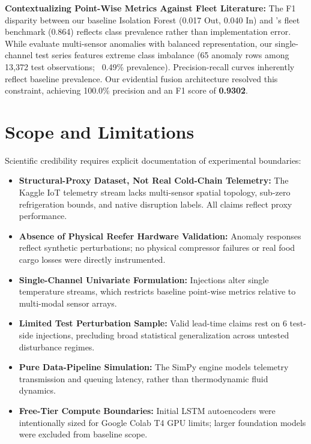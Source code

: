 \documentclass[11pt,a4paper,oneside]{report}
\begin{document}
\textbf{Contextualizing Point-Wise Metrics Against Fleet Literature:} The F1 disparity between our baseline Isolation Forest (0.017 Out, 0.040 In) and \textcite{xie2025anomaly}'s fleet benchmark (0.864) reflects class prevalence rather than implementation error. While \textcite{xie2025anomaly} evaluate multi-sensor anomalies with balanced representation, our single-channel test series features extreme class imbalance (65 anomaly rows among 13,372 test observations; ~0.49\% prevalence). Precision-recall curves inherently reflect baseline prevalence. Our evidential fusion architecture resolved this constraint, achieving 100.0\% precision and an F1 score of \textbf{0.9302}.

\chapter{Scope and Limitations}
\label{chap:limitations}

Scientific credibility requires explicit documentation of experimental boundaries:

\begin{limitationbox}
\begin{itemize}[leftmargin=*,itemsep=4pt]
    \item \textbf{Structural-Proxy Dataset, Not Real Cold-Chain Telemetry:} The Kaggle IoT telemetry stream lacks multi-sensor spatial topology, sub-zero refrigeration bounds, and native disruption labels. All claims reflect proxy performance.
    \item \textbf{Absence of Physical Reefer Hardware Validation:} Anomaly responses reflect synthetic perturbations; no physical compressor failures or real food cargo losses were directly instrumented.
    \item \textbf{Single-Channel Univariate Formulation:} Injections alter single temperature streams, which restricts baseline point-wise metrics relative to multi-modal sensor arrays.
    \item \textbf{Limited Test Perturbation Sample:} Valid lead-time claims rest on 6 test-side injections, precluding broad statistical generalization across untested disturbance regimes.
    \item \textbf{Pure Data-Pipeline Simulation:} The SimPy engine models telemetry transmission and queuing latency, rather than thermodynamic fluid dynamics.
    \item \textbf{Free-Tier Compute Boundaries:} Initial LSTM autoencoders were intentionally sized for Google Colab T4 GPU limits; larger foundation models were excluded from baseline scope.
\end{itemize}
\end{limitationbox}
\end{document}
